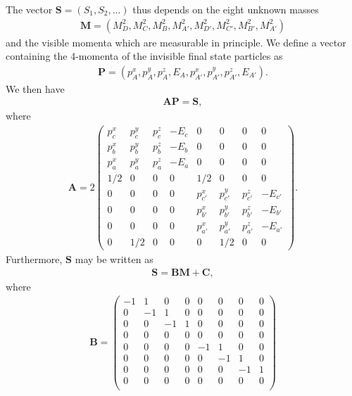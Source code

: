 \documentclass[twoside,english]{uiofysmaster}
\begin{document}
The vector $\mathbf{S} = (S_1, S_2, ...)$ thus depends on the eight unknown masses 
\begin{align}
	\mathbf{M} = (M_D^2, M_C^2, M_B^2, M_{A'}^2, M_{D'}^2, M_{C'}^2, M_{B'}^2, M_{A'}^2)
\end{align}
and the visible momenta which are measurable in principle. We define a vector containing the 4-momenta of the invisible final state particles as
\begin{align}
	\mathbf{P} = (p_A^x, p_A^y, p_A^z, E_A, p_{A'}^x, p_{A'}^y, p_{A'}^z, E_{A'}). \label{eq:Pvec}
\end{align}
We then have
\begin{align}
	\mathbf{A}\mathbf{P} = \mathbf{S},\label{eq:APS}
\end{align}
where
\begin{align}
	\mathbf{A} = 2 \begin{pmatrix}
						p_c^x & p_c^y & p_c^z & -E_c & 0 & 0 & 0 & 0 \\
						p_b^x & p_b^y & p_b^z & -E_b & 0 & 0 & 0 & 0 \\
						p_a^x & p_a^y & p_a^z & -E_a & 0 & 0 & 0 & 0 \\
						1/2 & 0 & 0 & 0 & 1/2 & 0 & 0 & 0\\
						0 & 0 & 0 & 0 & p_{c'}^x & p_{c'}^y & p_{c'}^z & -E_{c'} \\
						0 & 0 & 0 & 0 & p_{b'}^x & p_{b'}^y & p_{b'}^z & -E_{b'} \\
						0 & 0 & 0 & 0 & p_{a'}^x & p_{a'}^y & p_{a'}^z & -E_{a'} \\
						0 & 1/2 & 0 & 0 & 0 & 1/2 & 0 & 0
					\end{pmatrix}. \label{eq:Amatrix_orig}
\end{align}
Furthermore, $\mathbf{S}$ may be written as 
\begin{align}
	\mathbf{S} = \mathbf{B} \mathbf{M} + \mathbf{C},\label{eq:SBMC}
\end{align}
where
\begin{align}
	\mathbf{B} = \begin{pmatrix}
					-1 & 1 & 0 & 0 & 0 & 0 & 0 & 0 \\
					0 & -1 & 1 & 0 & 0 & 0 & 0 & 0 \\
					0 & 0 & -1 & 1 & 0 & 0 & 0 & 0 \\
					0 & 0 & 0 & 0 & 0 & 0 & 0 & 0 \\
					0 & 0 & 0 & 0 & -1 & 1 & 0 & 0 \\
					0 & 0 & 0 & 0 & 0 & -1 & 1 & 0 \\
					0 & 0 & 0 & 0 & 0 & 0 & -1 & 1 \\
					0 & 0 & 0 & 0 & 0 & 0 & 0 & 0 \\
	\end{pmatrix}
\end{align}
\end{document}
